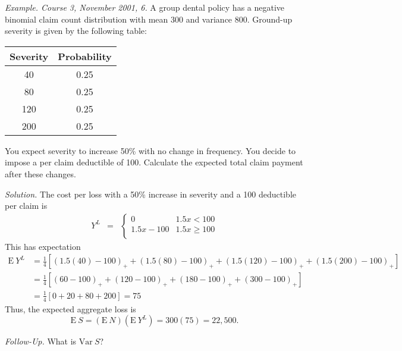 \documentclass[12pt,letterpaper]{article}
\begin{document}

\bigskip

\noindent \textit{Example. Course 3, November 2001, 6.} A group dental policy
has a negative binomial claim count distribution with mean 300 and variance 800. Ground-up severity is given by the following table:
\bigskip
\begin{center}
  \begin{tabular}{ c | c }
    \hline
      Severity & Probability\\ \hline
    40 & 0.25\\
    80 & 0.25\\
    120 & 0.25\\
    200 & 0.25\\
    \hline
  \end{tabular}
\end{center}
\bigskip
You expect severity to increase 50\% with no change in frequency. You decide to impose a per claim deductible of 100. Calculate the expected total claim payment after these changes.

\bigskip

\noindent \textit{Solution.} The cost per loss with a 50\% increase in severity and a 100 deductible per claim is
\begin{eqnarray*}
Y^L &=&
\left\{
\begin{array}{cc}
0 & 1.5x<100 \\
1.5x-100 & 1.5x\ge 100\\
\end{array}
\right.
\end{eqnarray*}
This has expectation
\begin{align*}
\mathrm{E~}Y^L &= \frac{1}{4} \left[ \left(1.5(40)-100\right)_+ +
\left(1.5(80)-100\right)_+ + \left(1.5(120)-100\right)_+ +
\left(1.5(200)-100\right)_+ \right]  \\
&= \frac{1}{4}\left[ (60-100)_+ + (120-100)_+ + (180-100)_+ + (300-100)_+\right] \\
&= \frac{1}{4}\left[ 0 + 20 + 80 + 200 \right] = 75
\end{align*}
Thus, the expected aggregate loss is
$$\mathrm{E~}S=(\mathrm{E~}N) \left( \mathrm{E~}Y^L \right)= 300 (75) = 22,500
.$$

\noindent \textit{Follow-Up.} What is $\mathrm{Var~}S$?

\bigskip
\end{document}
